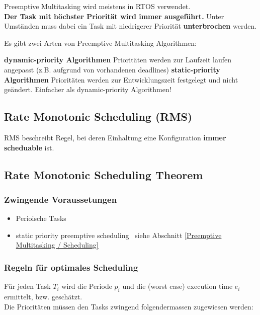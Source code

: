 Preemptive Multitasking wird meistens in RTOS verwendet. \\
\textbf{Der Task mit höchster Priorität wird immer ausgeführt.} Unter Umständen muss dabei ein Task mit niedrigerer Priorität
\textbf{unterbrochen} werden. 

\vspace{0.1 cm}

Es gibt zwei Arten von Preemptive Multitasking Algorithmen:

\begin{outline}
    \1 \textbf{dynamic-priority Algorithmen}
        \2 Prioritäten werden zur Laufzeit laufen angepasst (z.B. aufgrund von vorhandenen deadlines)
    \1 \textbf{static-priority Algorithmen}
        \2 Prioritäten werden zur Entwicklungszeit festgelegt und nicht geändert.
        \2 Einfacher als dynamic-priority Algorithmen!
\end{outline}


\subsection{Rate Monotonic Scheduling (RMS)}

RMS beschreibt Regel, bei deren Einhaltung eine Konfiguration \textbf{immer scheduable} ist.


\subsection{Rate Monotonic Scheduling Theorem}
\label{Rate Monotonic Scheduling Theorem}

\subsubsection{Zwingende Voraussetungen}

\begin{itemize}
    \item Perioische Tasks
    \item static priority preemptive scheduling \textrightarrow\ siehe Abschnitt \ref{Preemptive Multitasking / Scheduling}
\end{itemize}


\subsubsection{Regeln für optimales Scheduling}

Für jeden Task $T_i$ wird die Periode $p_i$ und die (worst case) execution time $e_i$ ermittelt, bzw. geschätzt. \\
Die Prioritäten müssen den Tasks zwingend folgendermassen zugewiesen werden:

